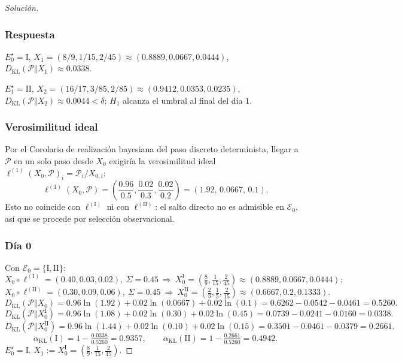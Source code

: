 \documentclass[12pt]{article}
\begin{document}
\begin{proof}[Solución]
\subsubsection*{Respuesta}
$E_0^\star=\mathrm I$, $X_1=(8/9,1/15,2/45)\approx(0.8889,0.0667,0.0444)$, $D_{\mathrm{KL}}(\mathcal P\Vert X_1)\approx0.0338$.

$E_1^\star=\mathrm{II}$, $X_2=(16/17,3/85,2/85)\approx(0.9412,0.0353,0.0235)$, $D_{\mathrm{KL}}(\mathcal P\Vert X_2)\approx0.0044<\delta$; $H_1$ alcanza el umbral al final del día $1$.

\subsubsection*{Verosimilitud ideal}
Por el Corolario de realización bayesiana del paso discreto determinista, llegar a $\mathcal P$ en un solo paso desde $X_0$ exigiría la verosimilitud ideal $\ell^{(1)}(X_0,\mathcal P)_i=\mathcal P_i/X_{0,i}$:
\[
\ell^{(1)}(X_0,\mathcal P)=\left(\frac{0.96}{0.5},\frac{0.02}{0.3},\frac{0.02}{0.2}\right)=(1.92,\,0.0667,\,0.1).
\]
Esto no coincide con $\ell^{(\mathrm I)}$ ni con $\ell^{(\mathrm{II})}$: el salto directo no es admisible en $\mathcal E_0$, así que se procede por selección observacional.

\subsubsection*{Día 0}
Con $\mathcal E_0=\{\mathrm I,\mathrm{II}\}$:
\[
X_0\circ\ell^{(\mathrm I)}=(0.40,0.03,0.02),\ \Sigma=0.45
\ \Rightarrow\
X_0^{\mathrm I}=\left(\tfrac{8}{9},\tfrac{1}{15},\tfrac{2}{45}\right)\approx(0.8889,0.0667,0.0444);
\]
\[
X_0\circ\ell^{(\mathrm{II})}=(0.30,0.09,0.06),\ \Sigma=0.45
\ \Rightarrow\
X_0^{\mathrm{II}}=\left(\tfrac{2}{3},\tfrac{1}{5},\tfrac{2}{15}\right)\approx(0.6667,0.2,0.1333).
\]
\[
D_{\mathrm{KL}}(\mathcal P\Vert X_0)=0.96\ln(1.92)+0.02\ln(0.0667)+0.02\ln(0.1)=0.6262-0.0542-0.0461=0.5260.
\]
\[
D_{\mathrm{KL}}(\mathcal P\Vert X_0^{\mathrm I})=0.96\ln(1.08)+0.02\ln(0.30)+0.02\ln(0.45)=0.0739-0.0241-0.0160=0.0338.
\]
\[
D_{\mathrm{KL}}(\mathcal P\Vert X_0^{\mathrm{II}})=0.96\ln(1.44)+0.02\ln(0.10)+0.02\ln(0.15)=0.3501-0.0461-0.0379=0.2661.
\]
\[
\alpha_{\mathrm{KL}}(\mathrm I)=1-\tfrac{0.0338}{0.5260}=0.9357,\qquad
\alpha_{\mathrm{KL}}(\mathrm{II})=1-\tfrac{0.2661}{0.5260}=0.4942.
\]
$E_0^\star=\mathrm I$. $X_1:=X_0^{\mathrm I}=\left(\tfrac{8}{9},\tfrac{1}{15},\tfrac{2}{45}\right)$.


\end{proof}
\end{document}
